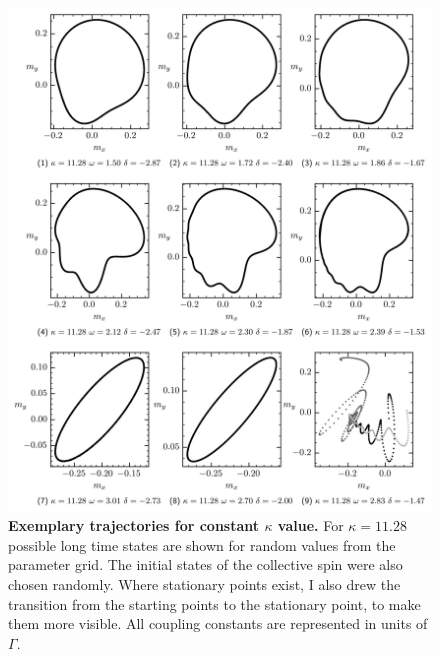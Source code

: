     \begin{figure}[H]
        \hspace*{-1cm}
        \includegraphics{pictures/lc_traj_kcut2.png}
        \caption{\textbf{Exemplary trajectories for constant $\kappa$ value.} For $\kappa=11.28$ possible long time states are shown for random values from the parameter grid. The initial states of the collective spin were also chosen randomly. Where stationary points exist, I also drew the transition from the starting points to the stationary point, to make them more visible. All coupling constants are represented in units of $\Gamma$.}
    \end{figure}
    

